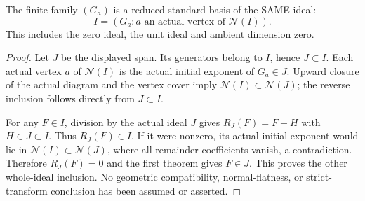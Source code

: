 \begin{theorem}
\label{hir:actual-reduced-formal-standard-basis-generation}
\leanok
The finite family $(G_a)$ is a reduced standard basis of the SAME ideal:
\[
 I=(G_a:a\text{ an actual vertex of }\mathcal N(I)).
\]
This includes the zero ideal, the unit ideal and ambient dimension zero.
\end{theorem}
\begin{proof}
Let $J$ be the displayed span. Its generators belong to $I$, hence
$J\subset I$. Each actual vertex $a$ of $\mathcal N(I)$ is the actual
initial exponent of $G_a\in J$. Upward closure of the actual diagram and
the vertex cover imply $\mathcal N(I)\subset\mathcal N(J)$; the reverse
inclusion follows directly from $J\subset I$.

For any $F\in I$, division by the actual ideal $J$ gives
$R_J(F)=F-H$ with $H\in J\subset I$. Thus $R_J(F)\in I$.
If it were nonzero, its actual initial exponent would lie in
$\mathcal N(I)\subset\mathcal N(J)$, where all remainder coefficients
vanish, a contradiction. Therefore $R_J(F)=0$ and the first theorem
gives $F\in J$. This proves the other whole-ideal inclusion. No
geometric compatibility, normal-flatness, or strict-transform conclusion
has been assumed or asserted.
\end{proof}
